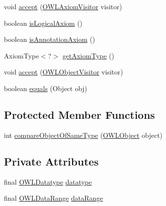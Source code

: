 \begin{DoxyCompactItemize}
\item 
void \hyperlink{classuk_1_1ac_1_1manchester_1_1cs_1_1owl_1_1owlapi_1_1_o_w_l_datatype_definition_axiom_impl_acbf7eb3db51b1460c2001422ea14acf5}{accept} (\hyperlink{interfaceorg_1_1semanticweb_1_1owlapi_1_1model_1_1_o_w_l_axiom_visitor}{O\-W\-L\-Axiom\-Visitor} visitor)
\item 
boolean \hyperlink{classuk_1_1ac_1_1manchester_1_1cs_1_1owl_1_1owlapi_1_1_o_w_l_datatype_definition_axiom_impl_a40fd41b777ba1538aeafcec96fce8a99}{is\-Logical\-Axiom} ()
\item 
boolean \hyperlink{classuk_1_1ac_1_1manchester_1_1cs_1_1owl_1_1owlapi_1_1_o_w_l_datatype_definition_axiom_impl_a08585ae6aeadc8a01fe9aabcc1569128}{is\-Annotation\-Axiom} ()
\item 
Axiom\-Type$<$?$>$ \hyperlink{classuk_1_1ac_1_1manchester_1_1cs_1_1owl_1_1owlapi_1_1_o_w_l_datatype_definition_axiom_impl_acfccb4e1c97c90cb6097899b09724b2b}{get\-Axiom\-Type} ()
\item 
void \hyperlink{classuk_1_1ac_1_1manchester_1_1cs_1_1owl_1_1owlapi_1_1_o_w_l_datatype_definition_axiom_impl_a695d99db302ab38111fcc1b237d15d21}{accept} (\hyperlink{interfaceorg_1_1semanticweb_1_1owlapi_1_1model_1_1_o_w_l_object_visitor}{O\-W\-L\-Object\-Visitor} visitor)
\item 
boolean \hyperlink{classuk_1_1ac_1_1manchester_1_1cs_1_1owl_1_1owlapi_1_1_o_w_l_datatype_definition_axiom_impl_a4cbf39d5986c45a970b1eb8d9ca71d1a}{equals} (Object obj)
\end{DoxyCompactItemize}
\subsection*{Protected Member Functions}
\begin{DoxyCompactItemize}
\item 
int \hyperlink{classuk_1_1ac_1_1manchester_1_1cs_1_1owl_1_1owlapi_1_1_o_w_l_datatype_definition_axiom_impl_aebd4089c5dad1a5ec6dab70f606a5c61}{compare\-Object\-Of\-Same\-Type} (\hyperlink{interfaceorg_1_1semanticweb_1_1owlapi_1_1model_1_1_o_w_l_object}{O\-W\-L\-Object} object)
\end{DoxyCompactItemize}
\subsection*{Private Attributes}
\begin{DoxyCompactItemize}
\item 
final \hyperlink{interfaceorg_1_1semanticweb_1_1owlapi_1_1model_1_1_o_w_l_datatype}{O\-W\-L\-Datatype} \hyperlink{classuk_1_1ac_1_1manchester_1_1cs_1_1owl_1_1owlapi_1_1_o_w_l_datatype_definition_axiom_impl_a82c80819ac61bd227d2e74ddeb19a4d6}{datatype}
\item 
final \hyperlink{interfaceorg_1_1semanticweb_1_1owlapi_1_1model_1_1_o_w_l_data_range}{O\-W\-L\-Data\-Range} \hyperlink{classuk_1_1ac_1_1manchester_1_1cs_1_1owl_1_1owlapi_1_1_o_w_l_datatype_definition_axiom_impl_a1486c60b9a09c2ece01b9c00e8742920}{data\-Range}
\end{DoxyCompactItemize}
